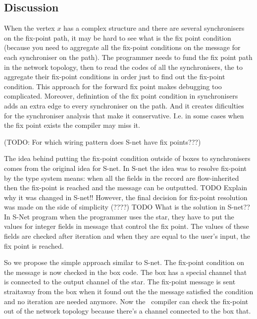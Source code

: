 

    \subsection{Discussion\label{ffp_discussion}}
When the vertex $x$ has a complex structure and there are several synchronisers on the fix-point path, it may be hard to see what is the fix point condition (because you need to aggregate all the fix-point conditions on the message for each synchroniser on the path). The programmer needs to fund the fix point path in the network topology, then to read the codes of all the synchronisers, the to aggregate their fix-point conditions in order just to find out the fix-point condition. This approach for the forward fix point makes debugging too complicated. Moreover, definintion of the fix point condition in synchronisers adds an extra edge to every synchroniser on the path. And it creates dificulties for the synchroniser analysis that make it conservative. I.e. in some cases when the fix point exists the compiler may miss it.

(TODO: For which wiring pattern does S-net have fix points???)

The idea behind putting the fix-point condition outside of boxes to synchronisers comes from the original idea for S-net. In S-net the idea was to resolve fix-point by the type system means: when all the fields in the record are flow-inherited then the fix-point is reached and the message can be outputted. TODO Explain why it was changed in S-net!! However, the final decision for fix-point resolution was made on the side of simplicity (????) TODO What is the solution in S-net??
In S-Net program when the programmer uses the star, they have to put the values for integer fields in message that control the fix point. The values of these fields are checked after iteration and when they are equal to the user's input, the fix point is reached.

So we propose the simple approach similar to S-net. The fix-point condition on the message is now checked in the box code. The box has a special channel that is connected to the output channel of the star. The fix-point message is sent straitaway from the box when it found out the the message satisfied the condition and no iteration are needed anymore. Now the \ak\ compiler can check the fix-point out of the network topology because there's a channel connected to the box that.


